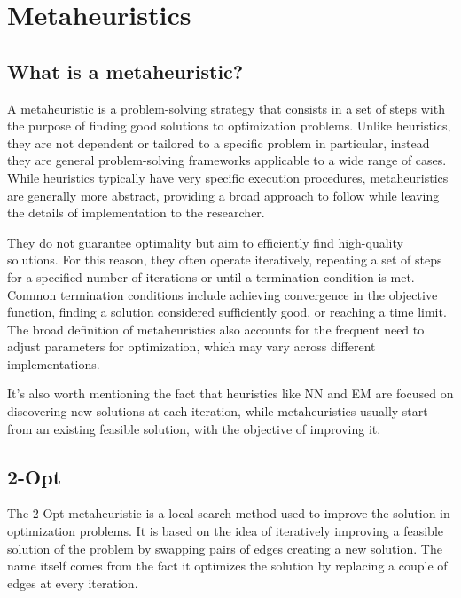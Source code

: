 \chapter{Metaheuristics}

\section{What is a metaheuristic?}

A metaheuristic is a problem-solving strategy that consists in a set of steps with the purpose of finding good solutions to optimization problems.
Unlike heuristics, they are not dependent or tailored to a specific problem in particular, instead they are general problem-solving frameworks applicable to a wide range of cases.
While heuristics typically have very specific execution procedures, metaheuristics are generally more abstract, providing a broad approach to follow while leaving the details of implementation to the researcher.

They do not guarantee optimality but aim to efficiently find high-quality solutions.
For this reason, they often operate iteratively, repeating a set of steps for a specified number of iterations or until a termination condition is met.
Common termination conditions include achieving convergence in the objective function, finding a solution considered sufficiently good, or reaching a time limit.
The broad definition of metaheuristics also accounts for the frequent need to adjust parameters for optimization, which may vary across different implementations.

It's also worth mentioning the fact that heuristics like NN and EM are focused on discovering new solutions at each iteration, while metaheuristics usually start from an existing feasible solution, with the objective of improving it.

\section{2-Opt}

The 2-Opt metaheuristic is a local search method used to improve the solution in optimization problems.
It is based on the idea of iteratively improving a feasible solution of the problem by swapping pairs of edges creating a new solution.
The name itself comes from the fact it optimizes the solution by replacing a couple of edges at every iteration.

